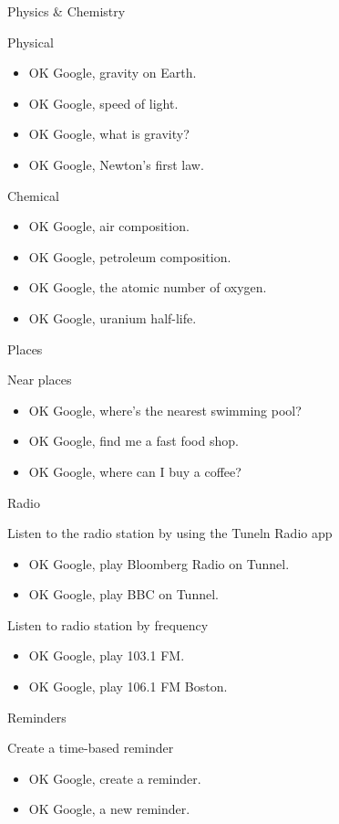 \documentclass[
  a4paper,
]{article}
\begin{document}
Physics \& Chemistry~~

Physical

\begin{itemize}
\item
  OK Google, gravity on Earth.
\item
  OK Google, speed of light.
\item
  OK Google, what is gravity?
\item
  OK Google, Newton's first law.
\end{itemize}

Chemical

\begin{itemize}
\item
  OK Google, air composition.
\item
  OK Google, petroleum composition.
\item
  OK Google, the atomic number of oxygen.
\item
  OK Google, uranium half-life.
\end{itemize}

Places

Near places

\begin{itemize}
\item
  OK Google, where's the nearest swimming pool?
\item
  OK Google, find me a fast food shop.
\item
  OK Google, where can I buy a coffee?
\end{itemize}

Radio

Listen to the radio station by using the Tuneln Radio app

\begin{itemize}
\item
  OK Google, play Bloomberg Radio on Tunnel.
\item
  OK Google, play BBC on Tunnel.
\end{itemize}

Listen to radio station by frequency

\begin{itemize}
\item
  OK Google, play 103.1 FM.
\item
  OK Google, play 106.1 FM Boston.
\end{itemize}

Reminders

Create a time-based reminder

\begin{itemize}
\item
  OK Google, create a reminder.
\item
  OK Google, a new reminder.
\end{itemize}
\end{document}
